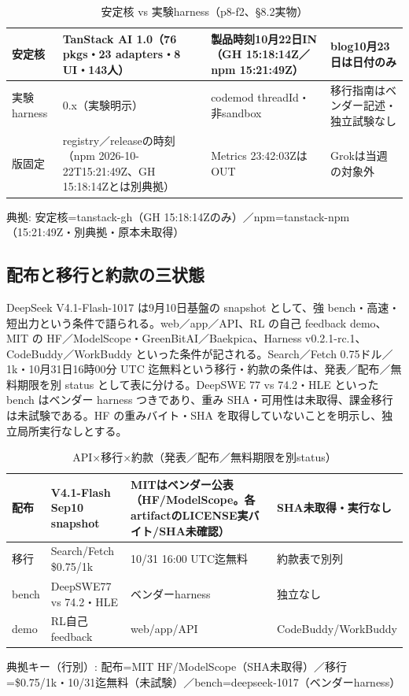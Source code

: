 \documentclass[lualatex,a4paper,10pt]{jlreq}
\begin{document}
\begin{table}[htbp]\centering\footnotesize
\caption{安定核 vs 実験harness（p8-f2、§8.2実物）}
\begin{tabularx}{0.96\linewidth}{@{}lXXX@{}}
\toprule
安定核 & TanStack AI 1.0（76 pkgs・23 adapters・8 UI・143人） & 製品時刻10月22日IN（GH 15:18:14Z／npm 15:21:49Z） & blog10月23日は日付のみ \\
\midrule
実験harness & 0.x（実験明示） & codemod threadId・非sandbox & 移行指南はベンダー記述・独立試験なし \\
版固定 & registry／releaseの時刻（npm 2026-10-22T15:21:49Z、GH 15:18:14Zとは別典拠） & Metrics 23:42:03ZはOUT & Grokは当週の対象外 \\
\bottomrule
\end{tabularx}
{\scriptsize\color{SurveyMuted} 典拠: 安定核=tanstack-gh（GH 15:18:14Zのみ）／npm=tanstack-npm（15:21:49Z・別典拠・原本未取得）\par}
\end{table}


\subsection*{配布と移行と約款の三状態}


DeepSeek V4.1-Flash-1017 は9月10日基盤の snapshot として、強 bench・高速・短出力という条件で語られる。web／app／API、RL の自己 feedback demo、MIT の HF／ModelScope・GreenBitAI／Baekpica、Harness v0.2.1-rc.1、CodeBuddy／WorkBuddy といった条件が記される。Search／Fetch 0.75ドル／1k・10月31日16時00分 UTC 迄無料という移行・約款の条件は、発表／配布／無料期限を別 status として表に分ける。DeepSWE 77 vs 74.2・HLE といった bench はベンダー harness つきであり、重み SHA・可用性は未取得、課金移行は未試験である。HF の重みバイト・SHA を取得していないことを明示し、独立局所実行なしとする。


\begin{table}[htbp]\centering\footnotesize
\caption{API×移行×約款（発表／配布／無料期限を別status）}
\begin{tabularx}{0.96\linewidth}{@{}lXXX@{}}
\toprule
配布 & V4.1-Flash Sep10 snapshot & MITはベンダー公表（HF/ModelScope。各artifactのLICENSE実バイト/SHA未確認） & SHA未取得・実行なし \\
\midrule
移行 & Search/Fetch \$0.75/1k & 10/31 16:00 UTC迄無料 & 約款表で別列 \\
bench & DeepSWE77 vs 74.2・HLE & ベンダーharness & 独立なし \\
demo & RL自己feedback & web/app/API & CodeBuddy/WorkBuddy \\
\bottomrule
\end{tabularx}
{\scriptsize\color{SurveyMuted} 典拠キー（行別）: 配布=MIT HF/ModelScope（SHA未取得）／移行=\$0.75/1k・10/31迄無料（未試験）／bench=deepseek-1017（ベンダーharness）\par}
\end{table}
\end{document}
